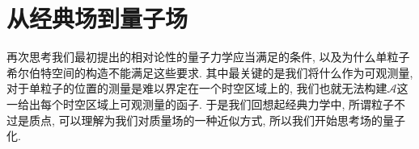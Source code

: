 \ifx\ALL\undefined


\maketitle
\setcounter{chapter}{2}
\fi

\chapter{从经典场到量子场}
再次思考我们最初提出的相对论性的量子力学应当满足的条件, 以及为什么单粒子希尔伯特空间的构造不能满足这些要求. 其中最关键的是我们将什么作为可观测量, 对于单粒子的位置的测量是难以界定在一个时空区域上的, 我们也就无法构建$\mathcal{A}$这一给出每个时空区域上可观测量的函子. 于是我们回想起经典力学中, 所谓粒子不过是质点, 可以理解为我们对质量场的一种近似方式, 所以我们开始思考场的量子化.
